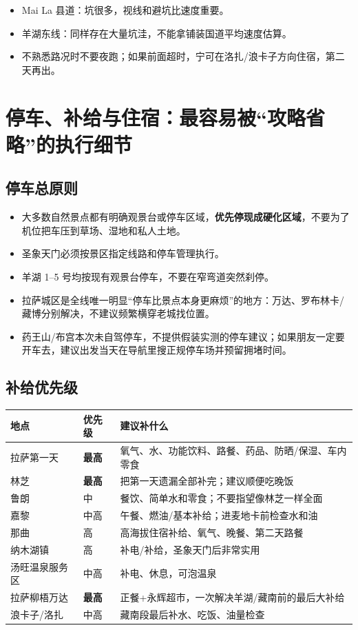 \documentclass[10.5pt,a4paper]{ctexart}
\begin{document}
\begin{itemize}
  \item Mai La 县道：坑很多，视线和避坑比速度重要。
  \item 羊湖东线：同样存在大量坑洼，不能拿铺装国道平均速度估算。
  \item 不熟悉路况时不要夜跑；如果前面超时，宁可在洛扎/浪卡子方向住宿，第二天再出。
\end{itemize}

\section{停车、补给与住宿：最容易被“攻略省略”的执行细节}

\subsection{停车总原则}
\begin{itemize}
  \item 大多数自然景点都有明确观景台或停车区域，\textbf{优先停现成硬化区域}，不要为了机位把车压到草场、湿地和私人土地。
  \item 圣象天门必须按景区指定线路和停车管理执行。
  \item 羊湖 1--5 号均按现有观景台停车，不要在窄弯道突然刹停。
  \item 拉萨城区是全线唯一明显“停车比景点本身更麻烦”的地方：万达、罗布林卡/藏博分别解决，不建议频繁横穿老城找位置。
  \item 药王山/布宫本次未自驾停车，不提供假装实测的停车建议；如果朋友一定要开车去，建议出发当天在导航里搜正规停车场并预留拥堵时间。
\end{itemize}

\subsection{补给优先级}
\begin{longtable}{p{3.2cm}p{3.0cm}p{8.4cm}}
\toprule
地点 & 优先级 & 建议补什么 \\
\midrule
拉萨第一天 & \textbf{最高} & 氧气、水、功能饮料、路餐、药品、防晒/保湿、车内零食 \\
林芝 & \textbf{最高} & 把第一天遗漏全部补完；建议顺便吃晚饭 \\
鲁朗 & 中 & 餐饮、简单水和零食；不要指望像林芝一样全面 \\
嘉黎 & 中高 & 午餐、燃油/基本补给；进麦地卡前检查水和油 \\
那曲 & 高 & 高海拔住宿补给、氧气、晚餐、第二天路餐 \\
纳木湖镇 & 高 & 补电/补给，圣象天门后非常实用 \\
汤旺温泉服务区 & 中高 & 补电、休息，可泡温泉 \\
拉萨柳梧万达 & \textbf{最高} & 正餐+永辉超市，一次解决羊湖/藏南前的最后大补给 \\
浪卡子/洛扎 & 中高 & 藏南段最后补水、吃饭、油量检查 \\
\bottomrule
\end{longtable}
\end{document}
